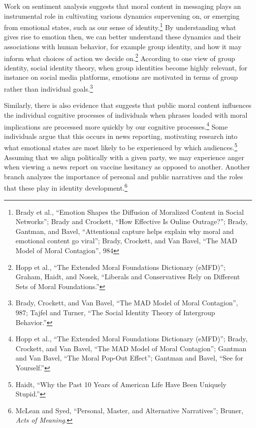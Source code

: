 \documentclass[phdthesis,12pt,final,a4paper]{wuthesis}
\theoremstyle{definition}
\theoremstyle{definition}
\theoremstyle{definition}
\theoremstyle{definition}
\theoremstyle{remark}
\begin{document}
Work on sentiment analysis suggests that moral content in messaging plays an instrumental role in cultivating various dynamics supervening on, or emerging from emotional states, such as our sense of identity.\footnote{Brady et al., {``Emotion Shapes the Diffusion of Moralized Content in Social Networks''}; Brady and Crockett, {``How Effective Is Online Outrage?''}; Brady, Gantman, and Bavel, {``Attentional capture helps explain why moral and emotional content go viral''}; Brady, Crockett, and Van Bavel, {``The {MAD} Model of Moral Contagion''}, 984} By understanding what gives rise to emotion then, we can better understand these dynamics and their associations with human behavior, for example group identity, and how it may inform what choices of action we decide on.\footnote{Hopp et al., {``The Extended {Moral Foundations Dictionary} ({eMFD})''}; Graham, Haidt, and Nosek, {``Liberals and Conservatives Rely on Different Sets of Moral Foundations.''}} According to one view of group identity, social identity theory, when group identities become highly relevant, for instance on social media platforms, emotions are motivated in terms of group rather than individual goals.\footnote{Brady, Crockett, and Van Bavel, {``The {MAD} Model of Moral Contagion''}, 987; Tajfel and Turner, {``The {Social Identity Theory} of {Intergroup Behavior}.''}}

Similarly, there is also evidence that suggests that public moral content influences the individual cognitive processes of individuals when phrases loaded with moral implications are processed more quickly by our cognitive processes.\footnote{Hopp et al., {``The Extended {Moral Foundations Dictionary} ({eMFD})''}; Brady, Crockett, and Van Bavel, {``The {MAD} Model of Moral Contagion''}; Gantman and Van Bavel, {``The Moral Pop-Out Effect''}; Gantman and Bavel, {``See for Yourself.''}} Some individuals argue that this occurs in news reporting, motivating research into what emotional states are most likely to be experienced by which audiences.\footnote{Haidt, {``Why the {Past} 10 {Years} of {American Life Have Been Uniquely Stupid}.''}} Assuming that we align politically with a given party, we may experience anger when viewing a news report on vaccine hesitancy as opposed to another. Another branch analyzes the importance of personal and public narratives and the roles that these play in identity development.\footnote{McLean and Syed, {``Personal, {Master}, and {Alternative Narratives}''}; Bruner, \emph{Acts of Meaning}.}
\end{document}

